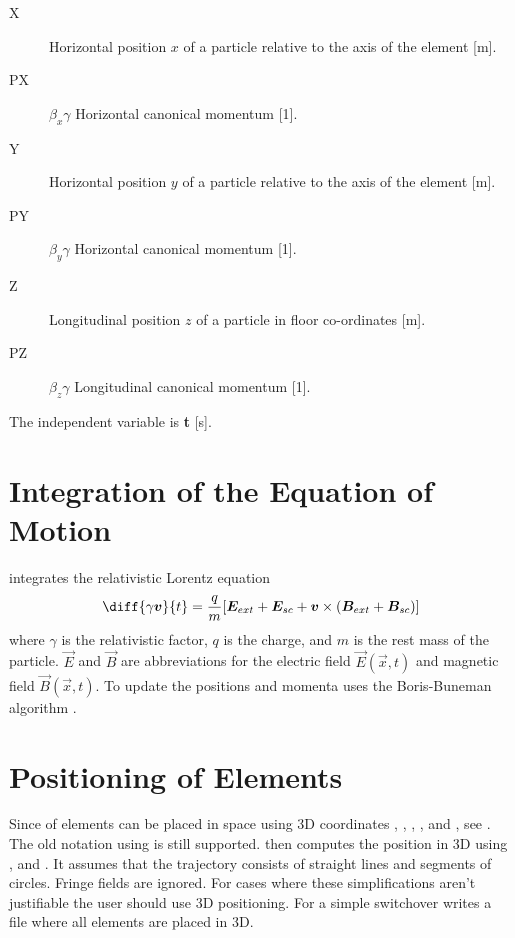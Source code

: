 \begin{description}
\item[X]
  Horizontal position $x$ of a particle relative to the axis of the element [m].

\item[PX]
  $\beta_x\gamma$ Horizontal canonical momentum [1].

\item[Y]
  Horizontal position $y$ of a particle relative to the axis of the element [m].

\item[PY]
  $\beta_y\gamma$ Horizontal canonical momentum [1].

\item[Z]
  Longitudinal position $z$ of a particle in floor co-ordinates [m].

\item[PZ]
 $\beta_z\gamma$ Longitudinal canonical momentum [1].

 \end{description}

The independent variable is  \textbf{t} [s].



\section{Integration of the Equation of Motion}
\opalt integrates the relativistic Lorentz equation
\begin{equation} \diff{\gamma\vec{v}}{t}
 =   \frac{q}{m}[\vec{E}_{ext} + \vec{E}_{sc} + \vec{v} \times (\vec{B}_{ext} + \vec{B}_{sc})]
\end{equation}
where $\gamma$ is the relativistic factor, $q$ is the charge, and $m$ is the rest mass of the particle. $\vec{E}$  and $\vec{B}$ are abbreviations for the electric field $\vec{E}(\vec{x},t)$ and  magnetic field $\vec{B}(\vec{x},t)$. To update the positions and momenta \opalt uses the Boris-Buneman algorithm \cite{langdon}.


\section{Positioning of Elements}
Since  of \opal elements can be placed in space using 3D coordinates , , , ,  and , see . The old notation using  is still supported. \opalt then computes the position in 3D using ,  and . It assumes that the trajectory consists of straight lines and segments of circles. Fringe fields are ignored. For cases where these simplifications aren't justifiable the user should use 3D positioning. For a simple switchover \opal writes a file  where all elements are placed in 3D.

